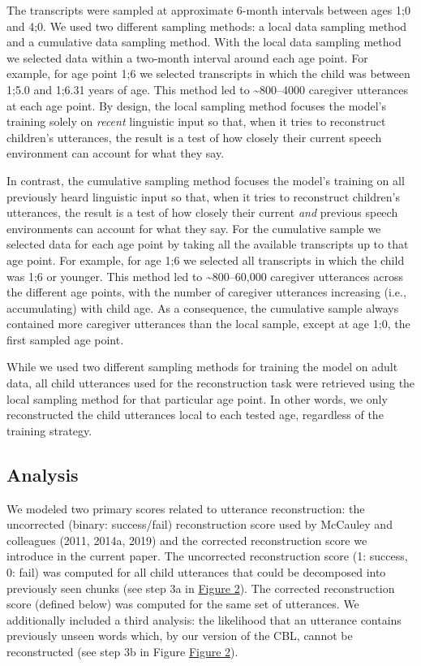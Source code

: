 \documentclass[man,mask,floatsintext]{apa6}
\theoremstyle{definition}
\theoremstyle{definition}
\theoremstyle{definition}
\theoremstyle{remark}
\begin{document}
The transcripts were sampled at approximate 6-month intervals between
ages 1;0 and 4;0. We used two different sampling methods: a local data
sampling method and a cumulative data sampling method. With the local
data sampling method we selected data within a two-month interval around
each age point. For example, for age point 1;6 we selected transcripts
in which the child was between 1;5.0 and 1;6.31 years of age. This
method led to \textasciitilde{}800--4000 caregiver utterances at each
age point. By design, the local sampling method focuses the model's
training solely on \emph{recent} linguistic input so that, when it tries
to reconstruct children's utterances, the result is a test of how
closely their current speech environment can account for what they say.

In contrast, the cumulative sampling method focuses the model's training
on all previously heard linguistic input so that, when it tries to
reconstruct children's utterances, the result is a test of how closely
their current \textit{and} previous speech environments can account for
what they say. For the cumulative sample we selected data for each age
point by taking all the available transcripts up to that age point. For
example, for age 1;6 we selected all transcripts in which the child was
1;6 or younger. This method led to \textasciitilde{}800--60,000
caregiver utterances across the different age points, with the number of
caregiver utterances increasing (i.e., accumulating) with child age. As
a consequence, the cumulative sample always contained more caregiver
utterances than the local sample, except at age 1;0, the first sampled
age point.

While we used two different sampling methods for training the model on
adult data, all child utterances used for the reconstruction task were
retrieved using the local sampling method for that particular age point.
In other words, we only reconstructed the child utterances local to each
tested age, regardless of the training strategy.

\subsection{Analysis}\label{analysis}

We modeled two primary scores related to utterance reconstruction: the
uncorrected (binary: success/fail) reconstruction score used by McCauley
and colleagues (2011, 2014a, 2019) and the corrected reconstruction
score we introduce in the current paper. The uncorrected reconstruction
score (1: success, 0: fail) was computed for all child utterances that
could be decomposed into previously seen chunks (see step 3a in
\protect\hyperlink{fig2}{Figure 2}). The corrected reconstruction score
(defined below) was computed for the same set of utterances. We
additionally included a third analysis: the likelihood that an utterance
contains previously unseen words which, by our version of the CBL,
cannot be reconstructed (see step 3b in Figure
\protect\hyperlink{fig2}{Figure 2}).
\end{document}

